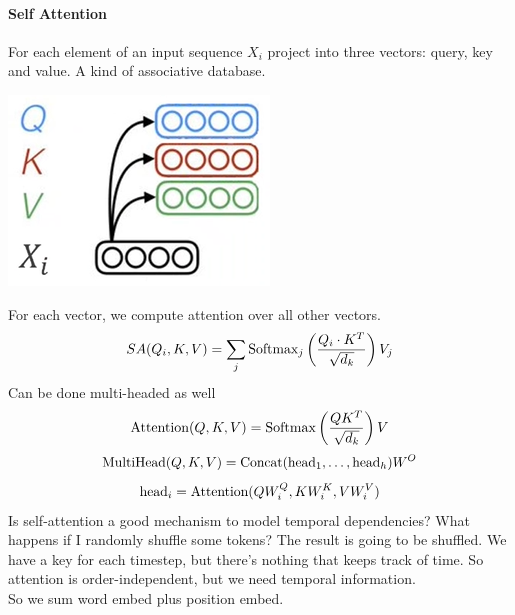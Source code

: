 \documentclass[10pt]{report}
\begin{document}
\paragraph{Self Attention} For each element of an input sequence $X_i$ project into three vectors: query, key and value. A kind of associative database.
\begin{center}
	\includegraphics[scale=0.5]{119.png}
\end{center}
For each vector, we compute attention over all other vectors.
$$SA(Q_i, K, V) = \sum_j\hbox{Softmax}_j\left(\frac{Q_i\cdot K^T}{\sqrt{d_k}}\right)V_j$$
Can be done multi-headed as well
$$\hbox{Attention}(Q,K,V)=\hbox{Softmax}\left(\frac{QK^T}{\sqrt{d_k}}\right)V$$
$$\hbox{MultiHead}(Q,K,V) = \hbox{Concat}(\hbox{head}_1,\ldots,\hbox{head}_h)W^O$$
$$\hbox{head}_i = \hbox{Attention}(QW_i^Q, KW_i^K, VW_i^V)$$
Is self-attention a good mechanism to model temporal dependencies? What happens if I randomly shuffle some tokens? The result is going to be shuffled. We have a key for each timestep, but there's nothing that keeps track of time. So attention is order-independent, but we need temporal information.\\
So we sum word embed plus position embed.
\end{document}
